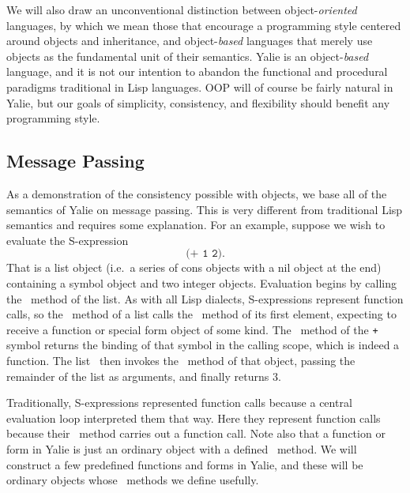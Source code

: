 \documentclass[twocolumn]{article}
\begin{document}
We will also draw an unconventional distinction between
object-\emph{oriented} languages, by which we mean those that
encourage a programming style centered around objects and inheritance,
and object-\emph{based} languages that merely use objects as the
fundamental unit of their semantics. Yalie is an object-\emph{based}
language, and it is not our intention to abandon the functional and
procedural paradigms traditional in Lisp languages. OOP will of course
be fairly natural in Yalie, but our goals of simplicity, consistency,
and flexibility should benefit any programming style.

\subsection*{Message Passing}
As a demonstration of the consistency possible with objects, we base
all of the semantics of Yalie on message passing. This is very
different from traditional Lisp semantics and requires some
explanation. For an example, suppose we wish to evaluate the
S-expression
\[ \texttt{(+ 1 2)}. \] That is a list object (i.e.\ a series of cons
objects with a nil object at the end) containing a symbol object and
two integer objects. Evaluation begins by calling the \eval\ method of
the list. As with all Lisp dialects, S-expressions represent function
calls, so the \eval\ method of a list calls the \eval\ method of its
first element, expecting to receive a function or special form object
of some kind. The \eval\ method of the \texttt{+} symbol returns the
binding of that symbol in the calling scope, which is indeed a
function. The list \eval\ then invokes the \call\ method of that
object, passing the remainder of the list as arguments, and finally
returns $3$.

Traditionally, S-expressions represented function calls because a
central evaluation loop interpreted them that way. Here they represent
function calls because their \eval\ method carries out a function
call. Note also that a function or form in Yalie is just an ordinary
object with a defined \call\ method. We will construct a few
predefined functions and forms in Yalie, and these will be ordinary
objects whose \call\ methods we define usefully.
\end{document}
